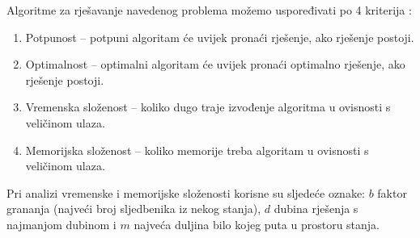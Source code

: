 Algoritme za rješavanje navedenog problema možemo uspoređivati po 4 kriterija \cite{russelNorvig2003:aima}:

\begin{enumerate}
	\item Potpunost -- potpuni algoritam će uvijek pronaći rješenje, ako rješenje postoji.
	\item Optimalnost -- optimalni algoritam će uvijek pronaći optimalno rješenje, ako rješenje postoji.
	\item Vremenska složenost -- koliko dugo traje izvođenje algoritma u ovisnosti s veličinom ulaza.
	\item Memorijska složenost -- koliko memorije treba algoritam u ovisnosti s veličinom ulaza.
\end{enumerate}

Pri analizi vremenske i memorijske složenosti korisne su sljedeće oznake: \( b \) faktor grananja (najveći broj sljedbenika iz nekog stanja), \( d \) dubina rješenja s najmanjom dubinom i \( m \) najveća duljina bilo kojeg puta u prostoru stanja.